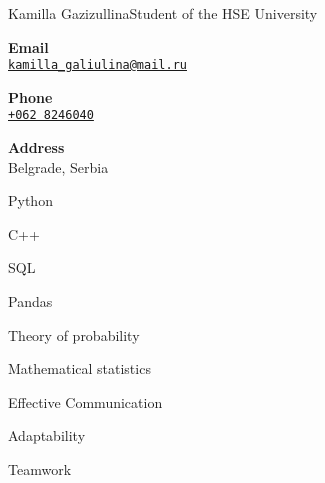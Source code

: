 \documentclass{article}
\begin{document}
\begin{cv}{Kamilla Gazizullina}{Student of the HSE University}

\begin{cvitem}[Envelope][0.6]
    \textbf{Email}\\
    \href{mailto:kamilla_galiulina@mail.ru}{\texttt{kamilla\_galiulina@mail.ru}}
\end{cvitem}

\cvseparator[3]
\begin{cvitem}[Phone][0.6]
    \textbf{Phone}\\
    \href{tel:+0628246040}{\texttt{+062 8246040}}
\end{cvitem}

\cvseparator[3]
\begin{cvitem}[Home][0.6]
    \textbf{Address}\\
    Belgrade, Serbia\\
\end{cvitem}



\begin{cvitem}
    Python
\end{cvitem}

\cvseparator
\begin{cvitem}
    C++
\end{cvitem}

\cvseparator
\begin{cvitem}
    SQL
\end{cvitem}

\cvseparator
\begin{cvitem}
    Pandas
\end{cvitem}

\cvseparator
\begin{cvitem}
    Theory of probability
\end{cvitem}

\cvseparator
\begin{cvitem}
    Mathematical statistics
\end{cvitem}

\cvseparator
\begin{cvitem}
    Effective Communication
\end{cvitem}

\cvseparator
\begin{cvitem}
    Adaptability
\end{cvitem}

\cvseparator
\begin{cvitem}
    Teamwork
\end{cvitem}




\end{cv}
\end{document}
